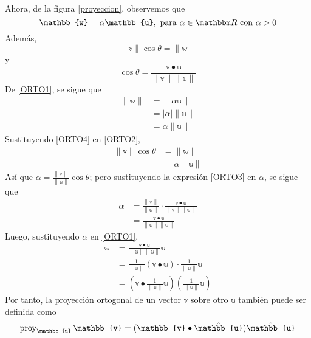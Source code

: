 Ahora, de la figura \ref{proyeccion}, observemos que
\begin{equation}
    \mathbb{w} = \alpha \mathbb{u}, \text{ para } \alpha \in \RR \text{ con } \alpha > 0 \label{ORTO1}
\end{equation}
Además,
\begin{equation}
    \| \mathbb{v} \| \cos \theta = \| \mathbb{w} \| \label{ORTO2}
\end{equation}
y
\begin{equation}
    \cos \theta = \frac{\mathbb{v} \bullet \mathbb{u}}{\| \mathbb{v} \| \| \mathbb{u} \|} \label{ORTO3}
\end{equation}
De \eqref{ORTO1}, se sigue que
\begin{align}
    \| \mathbb{w} \| & = \| \alpha \mathbb{u} \| \nonumber \\
    & = |\alpha| \| \mathbb{u} \| \nonumber \\
    & = \alpha \| \mathbb{u} \| \label{ORTO4}
\end{align}\newpage\noindent
Sustituyendo \eqref{ORTO4} en \eqref{ORTO2},
\begin{align*}
    \| \mathbb{v} \| \cos \theta & = \| \mathbb{w} \| \\
    & = \alpha \| \mathbb{u} \|
\end{align*}
Así que $\displaystyle \alpha = \frac{\| \mathbb{v} \|}{\| \mathbb{u} \|} \cos \theta$; pero sustituyendo la expresión \eqref{ORTO3} en $\alpha$, se sigue que
\begin{align*}
    \alpha & = \frac{\| \mathbb{v} \|}{\| \mathbb{u} \|} \cdot \frac{\mathbb{v} \bullet \mathbb{u}}{\| \mathbb{v} \| \| \mathbb{u} \|} \\
    & = \frac{\mathbb{v} \bullet \mathbb{u}}{\| \mathbb{u} \| \| \mathbb{u} \|}
\end{align*}
Luego, sustituyendo $\alpha$ en \eqref{ORTO1},
\begin{align*}
    \mathbb{w} & = \frac{\mathbb{v} \bullet \mathbb{u}}{\| \mathbb{u} \| \| \mathbb{u} \|} \mathbb{u} \\
    & = \frac{1}{\| \mathbb{u} \|} (\mathbb{v} \bullet \mathbb{u}) \cdot \frac{1}{\| \mathbb{u} \|} \mathbb{u} \\
    & = \left( \mathbb{v} \bullet \frac{1}{\| \mathbb{u} \|} \mathbb{u} \right) \left( \frac{1}{\| \mathbb{u} \|} \mathbb{u} \right)
\end{align*}
Por tanto, la proyección ortogonal de un vector \(\mathbb{v}\) sobre otro \(\mathbb{u}\) también puede ser definida como
\begin{equation}
    \proy_{\mathbb{u}} \mathbb{v} = (\mathbb{v} \bullet \hat{\mathbb{u}}) \hat{\mathbb{u}} \label{PROYECCION}
\end{equation}

